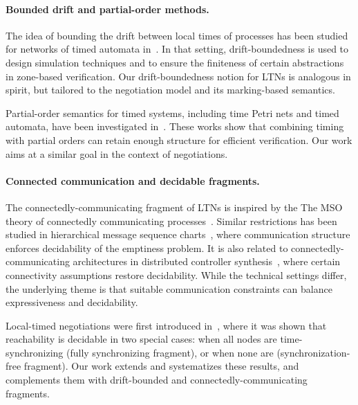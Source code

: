 \paragraph{Bounded drift and partial-order methods.}
The idea of bounding the drift between local times of processes has been studied for networks of timed automata in~\cite{DriftTA1,DriftTA2}. In that setting, drift-boundedness is used to design simulation techniques and to ensure the finiteness of certain abstractions in zone-based verification. Our drift-boundedness notion for LTNs is analogous in spirit, but tailored to the negotiation model and its marking-based semantics.

Partial-order semantics for timed systems, including time Petri nets and timed automata, have been investigated in~\cite{EsparzaUnfoldings,KhomenkoTimePN,LocalBuchi}. These works show that combining timing with partial orders can retain enough structure for efficient verification. Our work aims at a similar goal in the context of negotiations.

\paragraph{Connected communication and decidable fragments.}
The connectedly-communicating fragment of LTNs is inspired by the The MSO theory of connectedly communicating processes~\cite{}. Similar restrictions has been studied in hierarchical message sequence charts~\cite{HenriksenMSG}, where communication structure enforces decidability of the emptiness problem. It is also related to connectedly-communicating architectures in distributed controller synthesis~\cite{PnueliRosner}, where certain connectivity assumptions restore decidability. While the technical settings differ, the underlying theme is that suitable communication constraints can balance expressiveness and decidability.

Local-timed negotiations were first introduced in~\cite{}, where it was shown that reachability is decidable in two special cases: when all nodes are time-synchronizing (fully synchronizing fragment), or when none are (synchronization-free fragment). Our work extends and systematizes these results, and complements them with drift-bounded and connectedly-communicating fragments.



